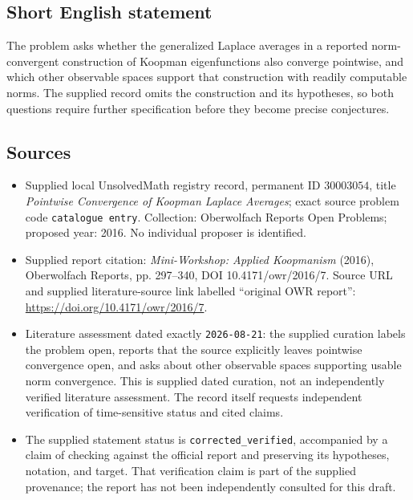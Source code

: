 \documentclass[11pt]{article}
\begin{document}
\subsection{Short English statement}
The problem asks whether the generalized Laplace averages in a reported norm-convergent construction of Koopman eigenfunctions also converge pointwise, and which other observable spaces support that construction with readily computable norms. The supplied record omits the construction and its hypotheses, so both questions require further specification before they become precise conjectures.
\subsection{Sources}
\begin{itemize}
\item Supplied local UnsolvedMath registry record, permanent ID \(30003054\), title \emph{Pointwise Convergence of Koopman Laplace Averages}; exact source problem code \texttt{catalogue entry}. Collection: Oberwolfach Reports Open Problems; proposed year: 2016. No individual proposer is identified.
\item Supplied report citation: \emph{Mini-Workshop: Applied Koopmanism} (2016), Oberwolfach Reports, pp. 297--340, DOI 10.4171/owr/2016/7. Source URL and supplied literature-source link labelled ``original OWR report'': \url{https://doi.org/10.4171/owr/2016/7}.
\item Literature assessment dated exactly \texttt{2026-08-21}: the supplied curation labels the problem open, reports that the source explicitly leaves pointwise convergence open, and asks about other observable spaces supporting usable norm convergence. This is supplied dated curation, not an independently verified literature assessment. The record itself requests independent verification of time-sensitive status and cited claims.
\item The supplied statement status is \texttt{corrected\_verified}, accompanied by a claim of checking against the official report and preserving its hypotheses, notation, and target. That verification claim is part of the supplied provenance; the report has not been independently consulted for this draft.
\end{itemize}
\end{document}
